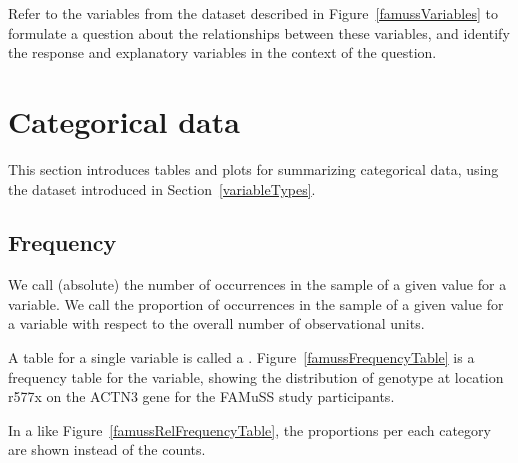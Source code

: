 \begin{exercisewrap}
\begin{nexercise}
Refer to the variables from the  dataset described in Figure~\ref{famussVariables} to formulate a question about the relationships between these variables, and identify the response and explanatory variables in the context of the question.\footnotemark{}
\end{nexercise}
\end{exercisewrap}







\section[Categorical data]{Categorical data}
\label{categoricalData}


This section introduces tables and plots for summarizing categorical data, using the  dataset introduced in Section~\ref{variableTypes}. 
\subsection[Frequency]{Frequency}

We call (absolute)   the number of occurrences in the sample of a
  given value for a variable. We call  the proportion of occurrences in the sample of a
  given value for a variable with respect to the overall number of observational units.
  

A table for a single variable is called a . Figure~\ref{famussFrequencyTable} is a frequency table for the  variable, showing the distribution of genotype at location r577x on the ACTN3 gene for the FAMuSS study participants.

In a  like Figure~\ref{famussRelFrequencyTable}, the proportions per each category are shown instead of the counts.

